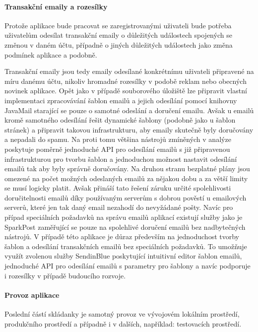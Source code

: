 			\paragraph{Transakční emaily a rozesílky}

			Protože aplikace bude pracovat se zaregistrovanými uživateli bude potřeba uživatelům odesílat transakční emaily
			o důležitých událostech spojených se změnou v daném účtu, případně o jiných důležitých událostech jako změna podmínek
			aplikace a podobně.

			Transakční emaily jsou tedy emaily odesílané konkrétnímu uživateli připravené na míru danému účtu, nikoliv
			hromadné rozesílky v podobě reklam nebo obecných novinek aplikace.
			Opět jako v případě souborového úložiště lze připravit vlastní implementaci zpracovávání šablon emailů a jejich
			odesílání pomocí knihovny JavaMail starající se pouze o samotné odeslání a doručení emailu.
			Avšak u emailů kromě samotného odesílání řešit dynamické šablony (podobně jako u šablon stránek) a připravit
			takovou infrastrukturu, aby emaily skutečně byly doručovány a nepadali do spamu.
			Na proti tomu většina nástrojů zmíněných v analýze poskytuje poměrně jednoduché \ac{API} pro odesílání emailů
			s již připravenou infrastrukturou pro tvorbu šablon a jednoduchou možnost nastavit odesílání emailů tak aby
			byly správně doručovány.
			Na druhou stranu bezplatné plány jsou omezené na počet možných odeslaných emailů za nějakou dobu a za větší limity
			se musí logicky platit.
			Avšak přináší tato řešení záruku určité spolehlivosti doručitelnosti emailů díky používaným serverům s dobrou pověstí
			u emailových serverů, které jen tak daný email nezahodí do nevyžádané pošty.
			Navíc pro případ speciálních požadavků na správu emailů aplikací existují služby jako je SparkPost zaměřující
			se pouze na spolehlivé doručení emailů bez nadbytečných nástrojů.
			V případě této aplikace je důraz především na jednoduchost tvorby šablon a odesílání transakčních emailů bez
			speciálních požadavků.
			To umožňuje využít zvolenou služby SendinBlue poskytující intuitivní editor šablon emailů, jednoduché \ac{API}
			pro odesílání emailů s parametry pro šablony a navíc podporuje i rozesílky v případě budoucího rozvoje.

			\paragraph{Provoz aplikace}

			Poslední částí skládanky je samotný provoz ve vývojovém lokálním prostředí, produkčního prostředí a případně
			i v dalších, například: testovacích prostředí.

